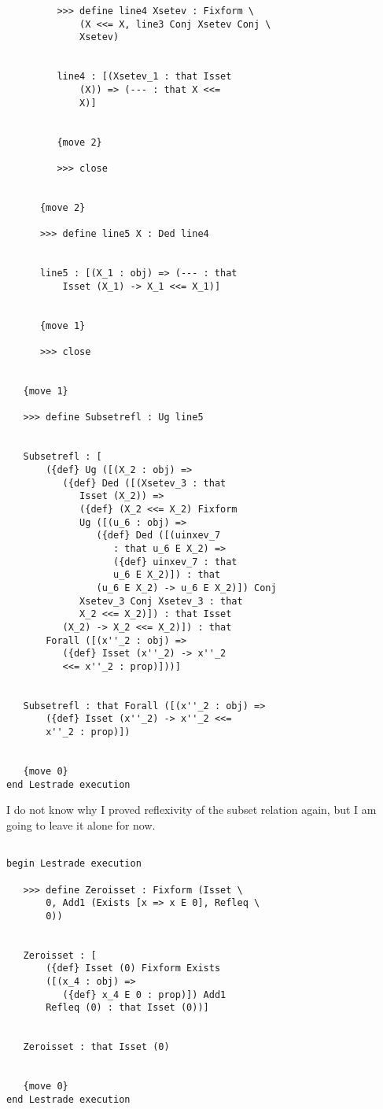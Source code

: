 \documentclass[12pt]{article}
\begin{document}
\begin{verbatim}
         >>> define line4 Xsetev : Fixform \
             (X <<= X, line3 Conj Xsetev Conj \
             Xsetev)


         line4 : [(Xsetev_1 : that Isset 
             (X)) => (--- : that X <<= 
             X)]


         {move 2}

         >>> close


      {move 2}

      >>> define line5 X : Ded line4


      line5 : [(X_1 : obj) => (--- : that 
          Isset (X_1) -> X_1 <<= X_1)]


      {move 1}

      >>> close


   {move 1}

   >>> define Subsetrefl : Ug line5


   Subsetrefl : [
       ({def} Ug ([(X_2 : obj) => 
          ({def} Ded ([(Xsetev_3 : that 
             Isset (X_2)) => 
             ({def} (X_2 <<= X_2) Fixform 
             Ug ([(u_6 : obj) => 
                ({def} Ded ([(uinxev_7 
                   : that u_6 E X_2) => 
                   ({def} uinxev_7 : that 
                   u_6 E X_2)]) : that 
                (u_6 E X_2) -> u_6 E X_2)]) Conj 
             Xsetev_3 Conj Xsetev_3 : that 
             X_2 <<= X_2)]) : that Isset 
          (X_2) -> X_2 <<= X_2)]) : that 
       Forall ([(x''_2 : obj) => 
          ({def} Isset (x''_2) -> x''_2 
          <<= x''_2 : prop)]))]


   Subsetrefl : that Forall ([(x''_2 : obj) => 
       ({def} Isset (x''_2) -> x''_2 <<= 
       x''_2 : prop)])


   {move 0}
end Lestrade execution
\end{verbatim}

I do not know why I proved reflexivity of the subset relation again, but I am going to leave it alone for now.

\begin{verbatim}

begin Lestrade execution

   >>> define Zeroisset : Fixform (Isset \
       0, Add1 (Exists [x => x E 0], Refleq \
       0))


   Zeroisset : [
       ({def} Isset (0) Fixform Exists 
       ([(x_4 : obj) => 
          ({def} x_4 E 0 : prop)]) Add1 
       Refleq (0) : that Isset (0))]


   Zeroisset : that Isset (0)


   {move 0}
end Lestrade execution
\end{verbatim}
\end{document}
